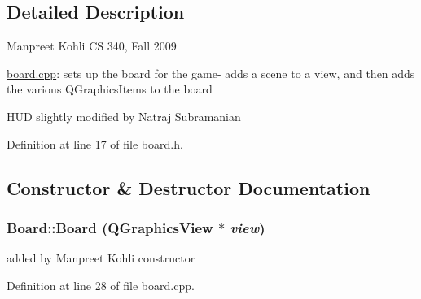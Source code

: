 \subsection{Detailed Description}
Manpreet Kohli CS 340, Fall 2009

\hyperlink{board_8cpp}{board.cpp}: sets up the board for the game-\/ adds a scene to a view, and then adds the various QGraphicsItems to the board

HUD slightly modified by Natraj Subramanian 

Definition at line 17 of file board.h.

\subsection{Constructor \& Destructor Documentation}
\hypertarget{class_board_a50940feb3a6bf930f03f15cc6347b333}{
\subsubsection[{Board}]{\setlength{\rightskip}{0pt plus 5cm}Board::Board (QGraphicsView $\ast$ {\em view})}}
\label{class_board_a50940feb3a6bf930f03f15cc6347b333}
added by Manpreet Kohli constructor 

Definition at line 28 of file board.cpp.


